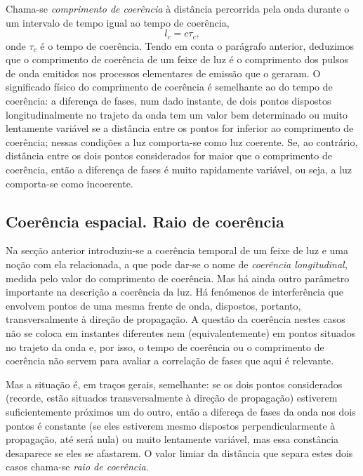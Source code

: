 Chama-se \emph{comprimento de coerência} à distância percorrida pela onda
durante o um intervalo de tempo igual ao tempo de coerência,
\begin{equation*}
l_c=c\tau_c,
\end{equation*}
onde $\tau_c$ é o tempo de coerência. Tendo em conta o parágrafo anterior,
deduzimos que o comprimento de coerência de um feixe de luz é o comprimento dos
pulsos de onda emitidos nos processos elementares de emissão que o geraram. O
significado físico do comprimento de coerência é semelhante ao do tempo de
coerência: a diferença de fases, num dado instante, de dois pontos dispostos
longitudinalmente no trajeto da onda tem um valor bem determinado ou muito
lentamente variável se a distância entre os pontos for inferior ao comprimento
de coerência; nessas condições a luz comporta-se como luz coerente. Se, ao
contrário,  distância entre os dois pontos considerados for maior que o
comprimento de coerência, então a diferença de fases é muito rapidamente
variável, ou seja, a luz comporta-se como incoerente.

\subsection{Coerência espacial. Raio de coerência}
Na secção anterior introduziu-se a coerência temporal de um feixe de luz e uma
noção com ela relacionada, a que pode dar-se o nome de \emph{coerência
longitudinal,} medida pelo valor do comprimento de coerência. Mas há ainda outro
parâmetro importante na descrição a coerência da luz. Há fenómenos de
interferência que envolvem pontos de uma mesma frente de onda, dispostos,
portanto, transversalmente à direção de propagação. A questão da coerência
nestes casos não se coloca em instantes diferentes nem (equivalentemente) em
pontos situados no trajeto da onda e, por isso, o tempo de coerência ou o
comprimento de coerência não servem para avaliar a correlação de fases que aqui
é relevante. 

Mas a situação é, em traços gerais, semelhante: se os dois pontos considerados
(recorde, estão situados transversalmente à direção de propagação) estiverem
suficientemente próximos um do outro, então a difereça de fases da onda nos dois
pontos é constante (se eles estiverem mesmo dispostos perpendicularmente à
propagação, até será nula) ou muito lentamente variável, mas essa constância
desaparece se eles se afastarem. O valor limiar da distância que separa estes
dois casos chama-se \emph{raio de coerência}.

